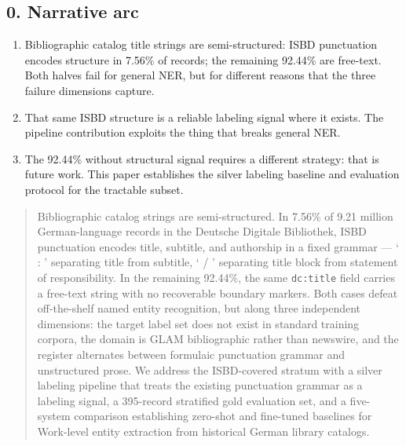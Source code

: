 \subsection*{0. Narrative arc}
\begin{enumerate}
    \item Bibliographic catalog title strings are semi-structured: ISBD punctuation
          encodes structure in 7.56\% of records; the remaining 92.44\% are
          free-text. Both halves fail for general NER, but for different reasons
          that the three failure dimensions capture.
    \item That same ISBD structure is a reliable labeling signal where it exists.
          The pipeline contribution exploits the thing that breaks general NER.
    \item The 92.44\% without structural signal requires a different strategy:
          that is future work. This paper establishes the silver labeling baseline
          and evaluation protocol for the tractable subset.
\end{enumerate}
\begin{quote}
    Bibliographic catalog strings are semi-structured.
    In 7.56\% of 9.21 million German-language records in the Deutsche Digitale
    Bibliothek, ISBD punctuation encodes title, subtitle, and authorship in a
    fixed grammar --- ` : ' separating title from subtitle, ` / ' separating
    title block from statement of responsibility.
    In the remaining 92.44\%, the same \texttt{dc:title} field carries a free-text
    string with no recoverable boundary markers.
    Both cases defeat off-the-shelf named entity recognition, but along three
    independent dimensions: the target label set does not exist in standard
    training corpora, the domain is GLAM bibliographic rather than newswire,
    and the register alternates between formulaic punctuation grammar and
    unstructured prose.
    We address the ISBD-covered stratum with a silver labeling pipeline that
    treats the existing punctuation grammar as a labeling signal, a 395-record
    stratified gold evaluation set, and a five-system comparison establishing
    zero-shot and fine-tuned baselines for Work-level entity extraction from
    historical German library catalogs.
\end{quote}
%

